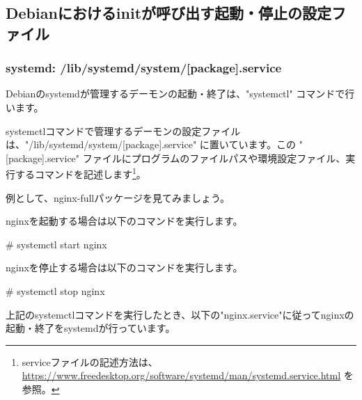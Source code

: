 \documentclass[mingoth,a4paper]{jsarticle}
\begin{document}
\subsection{Debianにおけるinitが呼び出す起動・停止の設定ファイル}

\subsubsection{systemd: /lib/systemd/system/[package].service}

Debianのsystemdが管理するデーモンの起動・終了は、"systemctl" コマンドで行います。


systemctlコマンドで管理するデーモンの設定ファイルは、"/lib/systemd/system/[package].service" に置いています。この "[package].service" ファイルにプログラムのファイルパスや環境設定ファイル、実行するコマンドを記述します\footnote{serviceファイルの記述方法は、\url{https://www.freedesktop.org/software/systemd/man/systemd.service.html} を参照。}。


例として、nginx-fullパッケージを見てみましょう。


nginxを起動する場合は以下のコマンドを実行します。

\begin{commandline}
# systemctl start nginx
\end{commandline}

nginxを停止する場合は以下のコマンドを実行します。

\begin{commandline}
# systemctl stop nginx
\end{commandline}


上記のsystemctlコマンドを実行したとき、以下の"nginx.service"に従ってnginxの起動・終了をsystemdが行っています。


\end{document}
